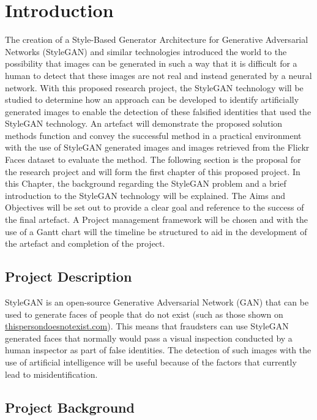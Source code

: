 \chapter{Introduction}\label{ch1}

The creation of a Style-Based Generator Architecture for Generative Adversarial Networks (StyleGAN) and similar technologies introduced the world to the possibility that images can be generated in such a way that it is difficult for a human to detect that these images are not real and instead generated by a neural network. With this proposed research project, the StyleGAN technology will be studied to determine how an approach can be developed to identify artificially generated images to enable the detection of these falsified identities that used the StyleGAN technology. An artefact will demonstrate the proposed solution methods function and convey the successful method in a practical environment with the use of StyleGAN generated images and images retrieved from the Flickr Faces dataset to evaluate the method. The following section is the proposal for the research project and will form the first chapter of this proposed project. In this Chapter, the background regarding the StyleGAN problem and a brief introduction to the StyleGAN technology will be explained. The Aims and Objectives will be set out to provide a clear goal and reference to the success of the final artefact. A Project management framework will be chosen and with the use of a Gantt chart will the timeline be structured to aid in the development of the artefact and completion of the project.

\section{Project Description}

StyleGAN is an open-source Generative Adversarial Network (GAN) that can be used to generate faces of people that do not exist (such as those shown on \href{https://www.thispersondoesnotexist.com}{thispersondoesnotexist.com}). This means that fraudsters can use StyleGAN generated faces that normally would pass a visual inspection conducted by a human inspector as part of false identities. The detection of such images with the use of artificial intelligence will be useful because of the factors that currently lead to misidentification.

\section{Project Background}

